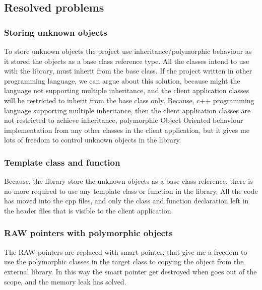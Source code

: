 \documentclass[12pt]{article}
\begin{document}
\subsection{Resolved problems }

\subsubsection{Storing unknown objects }
To store unknown objects the project use inheritance/polymorphic behaviour as it stored the objects as a base class reference type. All the classes intend to use with the library, must inherit from the base class. If the project written in other programming language, we can argue about this solution, because might the language not supporting multiple inheritance, and the client application classes will be restricted to inherit from the base class only. Because, c++ programming language supporting multiple inheritance, then the client application classes are not restricted to achieve inheritance, polymorphic Object Oriented behaviour implementation from any other classes in the client application, but it gives me lots of freedom to control unknown objects in the library.

\subsubsection{Template class and function }
Because, the library store the unknown objects as a base class reference, there is no more required to use any template class or function in the library. All the code has moved into the cpp files, and only the class and function declaration left in the header files that is visible to the client application.

\subsubsection{RAW pointers with polymorphic objects}
The RAW pointers are replaced with smart pointer, that give me a freedom to use the polymorphic classes in the target class to copying the object from the external library. In this way the smart pointer get destroyed when goes out of the scope, and the memory leak has solved.
\end{document}
